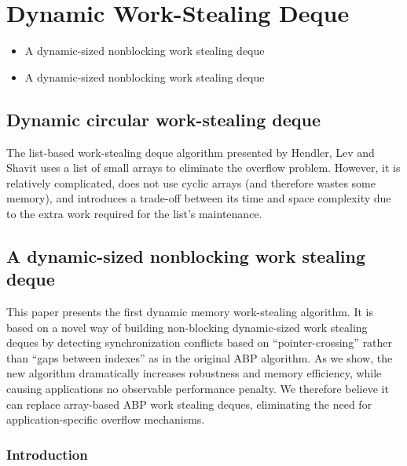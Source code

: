 \section{Dynamic Work-Stealing Deque}
\label{sec:queues-implementation-dynamic-ws-deque}


\begin{itemize}
\item A dynamic-sized nonblocking work stealing deque
  \cite{Hendler2006}
\item A dynamic-sized nonblocking work stealing deque
  \cite{Hendler2006a}
\end{itemize}

\subsection{Dynamic circular work-stealing deque \cite{Chase2005}}

The list-based work-stealing deque algorithm presented by Hendler, Lev
and Shavit \cite{Hendler2006, Hendler2006a} uses a list of small
arrays to eliminate the overflow problem. However, it is relatively
complicated, does not use cyclic arrays (and therefore wastes some
memory), and introduces a trade-off between its time and space
complexity due to the extra work required for the list's maintenance.

\subsection{A dynamic-sized nonblocking work stealing deque
  \cite{Hendler2006, Hendler2006a}}

This paper presents the first dynamic memory work-stealing
algorithm. It is based on a novel way of building non-blocking
dynamic-sized work stealing deques by detecting synchronization
conflicts based on ``pointer-crossing'' rather than ``gaps between
indexes'' as in the original ABP algorithm. As we show, the new
algorithm dramatically increases robustness and memory efficiency,
while causing applications no observable performance penalty. We
therefore believe it can replace array-based ABP work stealing deques,
eliminating the need for application-specific overflow mechanisms.

\subsubsection{Introduction}

